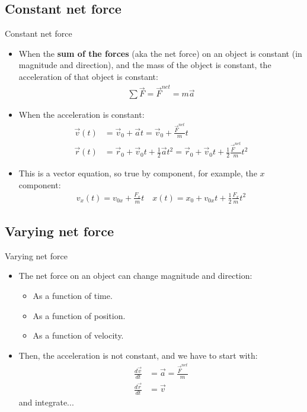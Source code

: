 \documentclass[aspectratio=169,
hyperref={colorlinks,urlcolor=blue}
]{beamer}
\begin{document}
\subsection{Constant net force}
\label{subsec:cnstnetforce}
\begin{frame}{Constant net force}
\begin{itemize}
\item When the \textbf{sum of the forces} (aka the net force) on an object is constant (in magnitude and direction), and the mass of the object is constant, the acceleration of that object is constant:
\begin{align*}
\sum \vec F = \vec F^{net}=m\vec a
\end{align*}
\item When the acceleration is constant:
\begin{align*}
\vec v(t) &= \vec v_0+\vec at=\vec v_0+\frac{\vec F^{net}}{m}t\\
\vec r(t) &= \vec r_0+\vec v_0 t+\frac{1}{2}\vec a t^2=\vec r_0+\vec v_0 t+\frac{1}{2} \frac{\vec F^{net}}{m} t^2
\end{align*}
\item This is a vector equation, so true by component, for example, the $x$ component:
\begin{align*}
v_x(t)=v_{0x}+\frac{F_x}{m}t\quad x(t)=x_0+v_{0x}t+\frac{1}{2}\frac{F_x}{m}t^2
\end{align*}
\end{itemize}

\end{frame}


\subsection{Varying net force}
\label{subsec:varying net force}
\begin{frame}{Varying net force}
\begin{itemize}
\item The net force on an object can change magnitude and direction:
\begin{itemize}
\item As a function of time.
\item As a function of position.
\item As a function of velocity.
\end{itemize}
\item Then, the acceleration is not constant, and we have to start with:
\begin{align*}
\frac{d\vec v}{dt}&=\vec a = \frac{\vec F^{net}}{m}\\
\frac{d\vec r}{dt}&=\vec v
\end{align*}
and integrate...
\end{itemize}

\end{frame}
\end{document}
